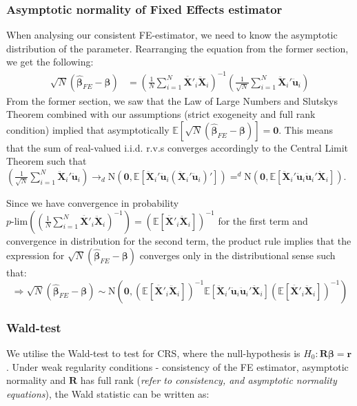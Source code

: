 \subsubsection{Asymptotic normality of Fixed Effects estimator}
When analysing our consistent FE-estimator, we need to know the asymptotic distribution of the parameter. Rearranging the equation from the former section, we get the following:
\begin{align*}
    \sqrt{N}(\pmb{\hat{\beta}}_{FE}-\pmb{\beta})&=  \left( \frac{1}{N} \sum_{i=1}^N {\pmb{\ddot{X'}}_{i} \pmb{\ddot{X}}_{i} } \right) ^{-1} \left( \frac{1}{\sqrt{N}} \sum_{i=1}^N {\pmb{\ddot{X}}_i' \pmb{\ddot{u}}_i} \right)
\end{align*}
From the former section, we saw that the Law of Large Numbers and Slutskys Theorem combined with our assumptions (strict exogeneity and full rank condition) implied that asymptotically $\mathbb{E}[\sqrt{N}(\pmb{\hat{\beta}}_{FE}-\pmb{\beta})]=\pmb{0}$. This means that the sum of real-valued i.i.d. r.v.s converges accordingly to the Central Limit Theorem such that $\left( \frac{1}{\sqrt{N}} \sum_{i=1}^N {\pmb{\ddot{X}}_i' \pmb{\ddot{u}}_i} \right)\rightarrow _d \text{N}(\pmb{0},\mathbb{E}[\pmb{\ddot{X}}_i' \pmb{\ddot{u}}_i(\pmb{\ddot{X}}_i' \pmb{\ddot{u}}_i)'])=^d \text{N}(\pmb{0},\mathbb{E}[\pmb{\ddot{X}}_i' \pmb{\ddot{u}}_i\pmb{\ddot{u}}_i'\pmb{\ddot{X}}_i])$.

Since we have convergence in probability $p\text{-lim}\left( \left(\frac{1}{N} \sum_{i=1}^N {\pmb{\ddot{X'}}_{i} \pmb{\ddot{X}}_{i} } \right)^{-1}\right)=(\mathbb{E}[\pmb{\ddot{X'}}_{i} \pmb{\ddot{X}}_{i}])^{-1}$ for the first term and convergence in distribution for the second term, the product rule implies that the expression for $\sqrt{N}(\pmb{\hat{\beta}}_{FE}-\pmb{\beta})$ converges only in the distributional sense such that:
$$\Rightarrow \sqrt{N}(\pmb{\hat{\beta}}_{FE}-\pmb{\beta}) \sim \text{N} \left(\pmb{0},
(\mathbb{E}[\pmb{\ddot{X'}}_{i} \pmb{\ddot{X}}_{i}])^{-1} \mathbb{E}[\pmb{\ddot{X}}_i' \pmb{\ddot{u}}_i\pmb{\ddot{u}}_i'\pmb{\ddot{X}}_i] (\mathbb{E}[\pmb{\ddot{X'}}_{i} \pmb{\ddot{X}}_{i}])^{-1} \right)$$



\subsubsection*{Wald-test}
We utilise the Wald-test to test for CRS, where the null-hypothesis is $H_0: \mathbf{R}\boldsymbol{\beta}=\mathbf{r}$. Under weak regularity conditions - consistency of the FE estimator, asymptotic normality and $\mathbf{R}$ has full rank (\textit{refer to  consistency, and asymptotic normality equations}), the Wald statistic can be written as:


